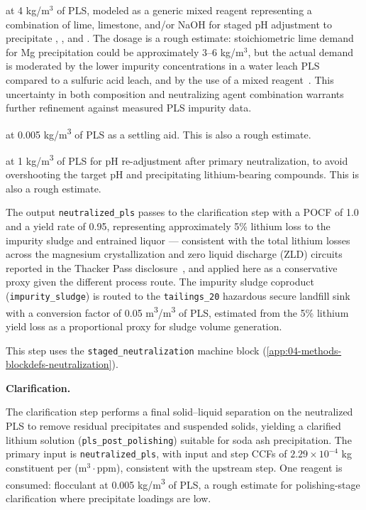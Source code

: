 \begin{description}[noitemsep, topsep=0pt]
\item[\textbullet\enskip Neutralizing agent] at 4 kg/m$^3$ of PLS, modeled as a generic mixed reagent representing a combination of lime, limestone, and/or NaOH for staged pH adjustment to precipitate , , and . The dosage is a rough estimate: stoichiometric lime demand for Mg precipitation could be approximately 3--6 kg/m$^3$, but the actual demand is moderated by the lower impurity concentrations in a water leach PLS compared to a sulfuric acid leach, and by the use of a mixed reagent~\cite{yanExtractionLithiumLepidolite2012, dengSystematicReviewSulfate2026}. This uncertainty in both composition and neutralizing agent combination warrants further refinement against measured PLS impurity data.
\item[\textbullet\enskip Flocculant] at 0.005 kg/m\textsuperscript{3} of PLS as a settling aid. This is also a rough estimate.
\item[\textbullet\enskip Sulfuric acid] at 1 kg/m\textsuperscript{3} of PLS for pH re-adjustment after primary neutralization, to avoid overshooting the target pH and precipitating lithium-bearing compounds. This is also a rough estimate.
\end{description}

The output \texttt{neutralized\_pls} passes to the clarification step with a POCF of 1.0 and a yield rate of 0.95, representing approximately 5\% lithium loss to the impurity sludge and entrained liquor --- consistent with the total lithium losses across the magnesium crystallization and zero liquid discharge (ZLD) circuits reported in the Thacker Pass disclosure~\cite{sgscanadaincSK1300Technical2024}, and applied here as a conservative proxy given the different process route. The impurity sludge coproduct (\texttt{impurity\_sludge}) is routed to the \texttt{tailings\_20} hazardous secure landfill sink with a conversion factor of 0.05 m\textsuperscript{3}/m\textsuperscript{3} of PLS, estimated from the 5\% lithium yield loss as a proportional proxy for sludge volume generation.

This step uses the \texttt{staged\_neutralization} machine block (\ref{app:04-methods-blockdefs-neutralization}).

\medskip
\noindent\textbf{Clarification.}\quad

The clarification step performs a final solid--liquid separation on the neutralized PLS to remove residual precipitates and suspended solids, yielding a clarified lithium solution (\texttt{pls\_post\_polishing}) suitable for soda ash precipitation. The primary input is \texttt{neutralized\_pls}, with input and step CCFs of $2.29 \times 10^{-4}$ kg constituent per (m$^3 \cdot$ppm), consistent with the upstream step. One reagent is consumed: flocculant at 0.005 kg/m\textsuperscript{3} of PLS, a rough estimate for polishing-stage clarification where precipitate loadings are low.
 
